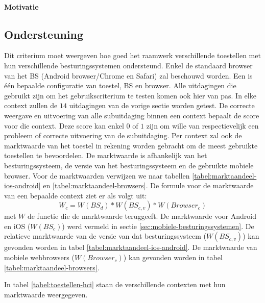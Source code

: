 \paragraph{Motivatie}


\subsection{Ondersteuning}
\label{sec:vergelijking-ondersteuning}
Dit criterium moet weergeven hoe goed het raamwerk verschillende toestellen met hun verschillende besturingssystemen ondersteund.
Enkel de standaard browser van het BS (Android browser/Chrome en Safari) zal beschouwd worden.
Een  is één bepaalde configuratie van toestel, BS en browser.
Alle uitdagingen die gebruikt zijn om het gebruikscriterium te testen komen ook hier van pas.
In elke context zullen de $14$ uitdagingen van de vorige sectie worden getest.
De correcte weergave en uitvoering van alle subuitdaging binnen een context bepaalt de score voor die context.
Deze score kan enkel $0$ of $1$ zijn om wille van respectievelijk een probleem of correcte uitvoering van de subuitdaging.
Per context zal ook de marktwaarde van het toestel in rekening worden gebracht om de meest gebruikte toestellen te bevoordelen.
De marktwaarde is afhankelijk van het besturingssysteem,  de versie van het besturingssysteem en de gebruikte mobiele browser.
Voor de marktwaarden verwijzen we naar tabellen \ref{tabel:marktaandeel-ios-android} en \ref{tabel:marktaandeel-browsers}.
De formule voor de marktwaarde van een bepaalde context ziet er als volgt uit:
\begin{equation}
  W_c = W(BS_d)*W(BS_{c,v})*W(Browser_c)
 \label{eq:marktwaarde}
\end{equation}
met $W$ de functie die de marktwaarde teruggeeft.  
De marktwaarde voor Android en iOS ($W(BS_c)$) werd vermeld in sectie \ref{sec:mobiele-besturingssystemen}.
De relatieve marktwaarde van de versie van dat besturingssysteem ($W(BS_{c,v})$) kan gevonden worden in tabel \ref{tabel:marktaandeel-ios-android}.
De marktwaarde van mobiele webbrowsers ($W(Browser_c)$) kan gevonden worden in tabel \ref{tabel:marktaandeel-browsers}.

In tabel \ref{tabel:toestellen-hci} staan de verschillende contexten met hun marktwaarde weergegeven.

